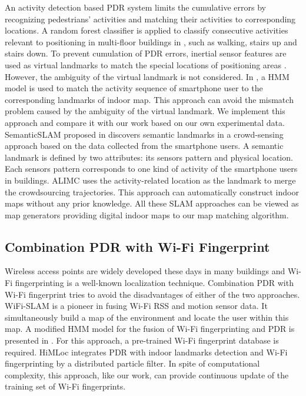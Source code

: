 \documentclass{llncs}
\begin{document}
An activity detection based PDR system limits the cumulative errors by recognizing pedestrians' activities and matching their activities to corresponding locations. A random forest classifier is applied to classify consecutive activities relevant to positioning in multi-floor buildings in \cite{bobkov2015activity}, such as walking, stairs up and stairs down. To prevent cumulation of PDR errors, inertial sensor features are used as virtual landmarks to match the special locations of positioning areas \cite{guo2017activity}. However, the ambiguity of the virtual landmark is not considered. In \cite{zhou2015activity}, a HMM model is used to match the activity sequence of smartphone user to the corresponding landmarks of indoor map. This approach can avoid the mismatch problem caused by the ambiguity of the virtual landmark. We implement this approach and compare it with our work based on our own experimental data. SemanticSLAM proposed in \cite{abdelnasser2016semanticslam} discovers semantic landmarks in a crowd-sensing approach based on the data collected from the smartphone users. A semantic landmark is defined by two attributes: its sensors pattern and physical location. Each sensors pattern corresponds to one kind of activity of the smartphone users in buildings. ALIMC \cite{zhou2015alimc} uses the activity-related location as the landmark to merge the crowdsourcing trajectories. This approach can automatically construct indoor maps without any prior knowledge. All these SLAM approaches can be viewed as map generators providing digital indoor maps to our map matching algorithm.

\subsection{Combination PDR with Wi-Fi Fingerprint}

Wireless access points are widely developed these days in many buildings and Wi-Fi fingerprinting is a well-known localization technique. Combination PDR with Wi-Fi fingerprint tries to avoid the disadvantages of either of the two approaches. WiFi-SLAM \cite{Ferris2007WiFi} is a pioneer in fusing Wi-Fi RSS and motion sensor data. It simultaneously build a map of the environment and locate the user within this map. A modified HMM model for the fusion of Wi-Fi fingerprinting and PDR is presented in \cite{hoang2013hidden}. For this approach, a pre-trained Wi-Fi fingerprint database is required. HiMLoc \cite{radu2013himloc} integrates PDR with indoor landmarks detection and Wi-Fi fingerprinting by a distributed particle filter. In spite of computational complexity, this approach, like our work, can provide continuous update of the training set of Wi-Fi fingerprints.
\end{document}
